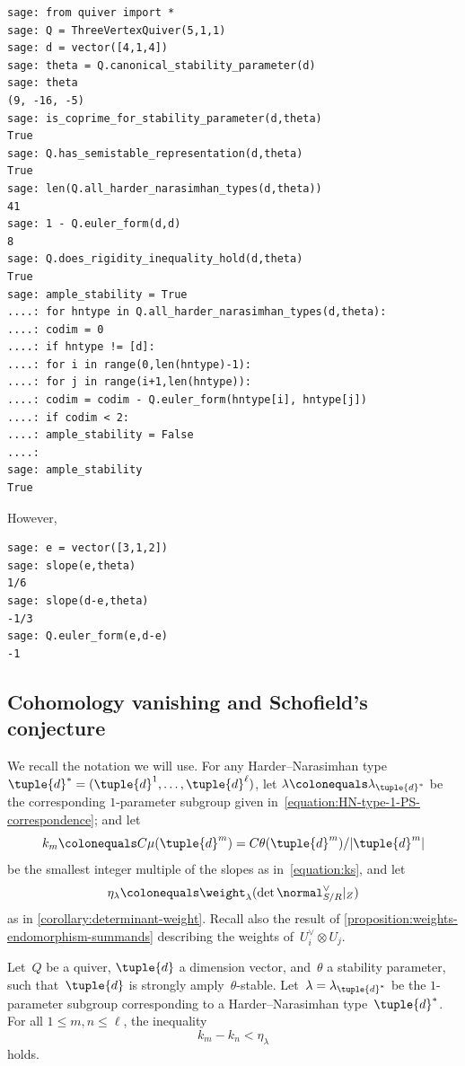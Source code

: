 \begin{example}
\begin{verbatim}
sage: from quiver import *
sage: Q = ThreeVertexQuiver(5,1,1)
sage: d = vector([4,1,4])
sage: theta = Q.canonical_stability_parameter(d)
sage: theta
(9, -16, -5)
sage: is_coprime_for_stability_parameter(d,theta)
True
sage: Q.has_semistable_representation(d,theta)
True
sage: len(Q.all_harder_narasimhan_types(d,theta))
41
sage: 1 - Q.euler_form(d,d)
8
sage: Q.does_rigidity_inequality_hold(d,theta)
True
sage: ample_stability = True
....: for hntype in Q.all_harder_narasimhan_types(d,theta):
....: codim = 0
....: if hntype != [d]:
....: for i in range(0,len(hntype)-1):
....: for j in range(i+1,len(hntype)):
....: codim = codim - Q.euler_form(hntype[i], hntype[j])
....: if codim < 2:
....: ample_stability = False
....:
sage: ample_stability
True
\end{verbatim}
However,
\begin{verbatim}
sage: e = vector([3,1,2])
sage: slope(e,theta)
1/6
sage: slope(d-e,theta)
-1/3
sage: Q.euler_form(e,d-e)
-1
\end{verbatim}
\fi
\end{example}

\subsection{Cohomology vanishing and Schofield's conjecture}
\label{subsection:cohomology-vanishing}
We recall the notation we will use.
For any Harder--Narasimhan type $\tuple{d}^* = (\tuple{d}^1,\dots,\tuple{d}^\ell)$,
let $\lambda \colonequals \lambda_{\tuple{d}^*}$ be the corresponding $1$-parameter subgroup
given in~\eqref{equation:HN-type-1-PS-correspondence};
and let\vspace*{-3pt}
\begin{equation*}
k_m \colonequals C\mu(\tuple{d}^m)=C\theta(\tuple{d}^m)/\lvert\tuple{d}^m\rvert
\end{equation*}
be the smallest integer multiple of the slopes
as in~\eqref{equation:ks},
and let\vspace*{-3pt}
\begin{equation*}
\eta_\lambda\colonequals\weight_\lambda(\det\normal_{S/R}^\vee|_Z)
\end{equation*}
as in \cref{corollary:determinant-weight}.
Recall also the result of \cref{proposition:weights-endomorphism-summands}
describing the weights of~$U_i^\vee\otimes U_j$.

\begin{proposition}
\label{proposition:inequality}
Let~$Q$ be a quiver,
$\tuple{d}$ a dimension vector,
and~$\theta$ a stability parameter,
such that~$\tuple{d}$ is strongly amply~$\theta$-stable.
Let~$\lambda=\lambda_{\tuple{d}^*}$ be the $1$-parameter subgroup
corresponding to a Harder--Narasimhan type~$\tuple{d}^*$.
For all $1 \leq m,n\leq\ell$, the inequality\vspace*{-3pt}
\begin{equation}
\label{equation:teleman-inequality}
k_m-k_n<\eta_\lambda
\end{equation}
holds.
\end{proposition}

